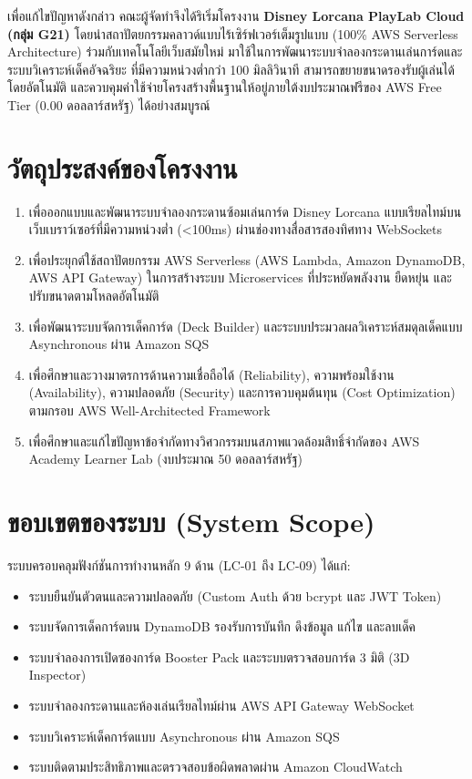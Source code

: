 \documentclass[12pt,a4paper]{report}
\begin{document}
เพื่อแก้ไขปัญหาดังกล่าว คณะผู้จัดทำจึงได้ริเริ่มโครงงาน \textbf{Disney Lorcana PlayLab Cloud (กลุ่ม G21)} โดยนำสถาปัตยกรรมคลาวด์แบบไร้เซิร์ฟเวอร์เต็มรูปแบบ (100\% AWS Serverless Architecture) ร่วมกับเทคโนโลยีเว็บสมัยใหม่ มาใช้ในการพัฒนาระบบจำลองกระดานเล่นการ์ดและระบบวิเคราะห์เด็คอัจฉริยะ ที่มีความหน่วงต่ำกว่า 100 มิลลิวินาที สามารถขยายขนาดรองรับผู้เล่นได้โดยอัตโนมัติ และควบคุมค่าใช้จ่ายโครงสร้างพื้นฐานให้อยู่ภายใต้งบประมาณฟรีของ AWS Free Tier (0.00 ดอลลาร์สหรัฐ) ได้อย่างสมบูรณ์

\section{วัตถุประสงค์ของโครงงาน}
\begin{enumerate}
    \item เพื่อออกแบบและพัฒนาระบบจำลองกระดานซ้อมเล่นการ์ด Disney Lorcana แบบเรียลไทม์บนเว็บเบราว์เซอร์ที่มีความหน่วงต่ำ (<100ms) ผ่านช่องทางสื่อสารสองทิศทาง WebSockets
    \item เพื่อประยุกต์ใช้สถาปัตยกรรม AWS Serverless (AWS Lambda, Amazon DynamoDB, AWS API Gateway) ในการสร้างระบบ Microservices ที่ประหยัดพลังงาน ยืดหยุ่น และปรับขนาดตามโหลดอัตโนมัติ
    \item เพื่อพัฒนาระบบจัดการเด็คการ์ด (Deck Builder) และระบบประมวลผลวิเคราะห์สมดุลเด็คแบบ Asynchronous ผ่าน Amazon SQS
    \item เพื่อศึกษาและวางมาตรการด้านความเชื่อถือได้ (Reliability), ความพร้อมใช้งาน (Availability), ความปลอดภัย (Security) และการควบคุมต้นทุน (Cost Optimization) ตามกรอบ AWS Well-Architected Framework
    \item เพื่อศึกษาและแก้ไขปัญหาข้อจำกัดทางวิศวกรรมบนสภาพแวดล้อมสิทธิ์จำกัดของ AWS Academy Learner Lab (งบประมาณ 50 ดอลลาร์สหรัฐ)
\end{enumerate}

\section{ขอบเขตของระบบ (System Scope)}
ระบบครอบคลุมฟังก์ชันการทำงานหลัก 9 ด้าน (LC-01 ถึง LC-09) ได้แก่:
\begin{itemize}
    \item ระบบยืนยันตัวตนและความปลอดภัย (Custom Auth ด้วย bcrypt และ JWT Token)
    \item ระบบจัดการเด็คการ์ดบน DynamoDB รองรับการบันทึก ดึงข้อมูล แก้ไข และลบเด็ค
    \item ระบบจำลองการเปิดซองการ์ด Booster Pack และระบบตรวจสอบการ์ด 3 มิติ (3D Inspector)
    \item ระบบจำลองกระดานและห้องเล่นเรียลไทม์ผ่าน AWS API Gateway WebSocket
    \item ระบบวิเคราะห์เด็คการ์ดแบบ Asynchronous ผ่าน Amazon SQS
    \item ระบบติดตามประสิทธิภาพและตรวจสอบข้อผิดพลาดผ่าน Amazon CloudWatch
\end{itemize}
\end{document}
